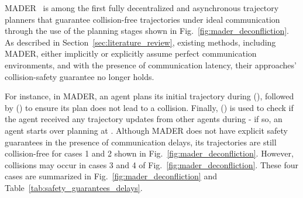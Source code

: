 MADER~\cite{tordesillas2020mader} is among the first fully decentralized and asynchronous trajectory planners that guarantee collision-free trajectories under ideal communication through the use of the planning stages shown in Fig.~\ref{fig:mader_deconfliction}. As described in Section~\ref{sec:literature_review}, existing methods, including MADER, either implicitly or explicitly assume perfect communication environments, and with the presence of communication latency, their approaches' collision-safety guarantee no longer holds.

For instance, in MADER, an agent plans its initial trajectory during \OptimizationStep{} (\OStep{}), followed by \CheckStep{} (\CStep{}) to ensure its plan does not lead to a collision.
Finally, \RecheckStep{} (\RStep{}) is used to check if the agent received any trajectory updates from other agents during \CStep{} - if so, an agent starts over planning at \OStep{}.
Although MADER does not have explicit safety guarantees in the presence of communication delays, its trajectories are still collision-free for cases 1 and 2 shown in Fig.~\ref{fig:mader_deconfliction}. However,  collisions may occur in cases 3 and 4 of Fig.~\ref{fig:mader_deconfliction}.
These four cases are summarized in Fig.~\ref{fig:mader_deconfliction} and Table~\ref{tab:safety_guarantees_delays}.

